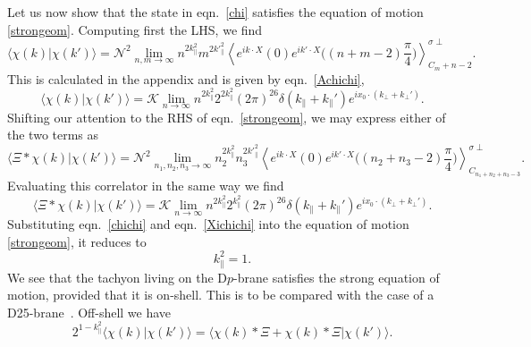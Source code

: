 \documentclass[letterpaper,12pt]{article}
\def\Pcm#1{{\mathcal{#1}}}
\def\er#1{eqn.~\eqref{#1}}
\begin{document}
Let us now show that the state in \er{chi} satisfies the equation of motion \eqref{strongeom}.
Computing first the LHS, we find
\begin{equation}
\label{Cappcc}
\big\langle\chi(k)\big|\chi(k')\big\rangle=\Pcm{N}^2\lim_{n,m\rightarrow\infty}
 n^{2k_\parallel^2}m^{2{k'}_\parallel^2}
 \left\langle e^{ik\cdot X}(0)e^{ik'\cdot X}\big((n+m-2)\frac\pi4\big)\right\rangle^{\sigma\perp}_{C_m+n-2}
.\end{equation}
This is calculated in the appendix and is given by \er{Achichi},
\begin{equation}
\label{chichi}
\big\langle\chi(k)\big|\chi(k')\big\rangle
 =\Pcm{K}
 \lim_{n\rightarrow\infty} n^{2k_\parallel^2}
 2^{2k_\parallel^2}
 (2\pi)^{26}\delta(k_\parallel+k_\parallel')e^{ix_0\cdot (k_\perp+k_\perp')}
.\end{equation}
Shifting our attention to the RHS of \er{strongeom}, we may express either of the two terms as
\begin{equation}
\label{xcc}
\big\langle \Xi * \chi(k) \big| \chi(k') \big\rangle = \Pcm{N}^2 \lim_{n_1,n_2,n_3\rightarrow\infty}
  n_2^{2k_\parallel^2}n_3^{2{k'}_\parallel^2}
 \left\langle e^{ik\cdot X}(0)e^{ik'\cdot X}\big((n_2+n_3-2)\frac\pi4\big)
 \right\rangle^{\sigma\perp}_{C_{n_1+n_2+n_3-3}}
.\end{equation}
Evaluating this correlator in the same way we find
\begin{equation}
\label{Xichichi}
\big\langle \Xi * \chi(k) \big| \chi(k') \big\rangle
 = %
 \Pcm{K}
 \lim_{n\rightarrow\infty} n^{2k_\parallel^2}
 2^{k_\parallel^2} 
(2\pi)^{26}\delta(k_\parallel+k_\parallel')e^{ix_0\cdot (k_\perp+k_\perp')}
.\end{equation}
Substituting \er{chichi} and \er{Xichichi} into the equation of motion \eqref{strongeom},
it reduces to
\begin{equation}
\label{kseo}
k_\parallel^2=1
.\end{equation}
We see that the tachyon living on the D$p$-brane satisfies the strong equation of 
motion, provided that it is on-shell. 
This is to be compared with the case of a D25-brane~\cite{RV}.
Off-shell we have
\begin{equation}
\label{OSseom}
 2^{1-k_\parallel^2}\big\langle\chi(k)\big|\chi(k')\big\rangle = 
     \big\langle \chi(k) * \Xi + \chi(k) * \Xi \big| \chi(k') \big\rangle
.\end{equation}
\end{document}
